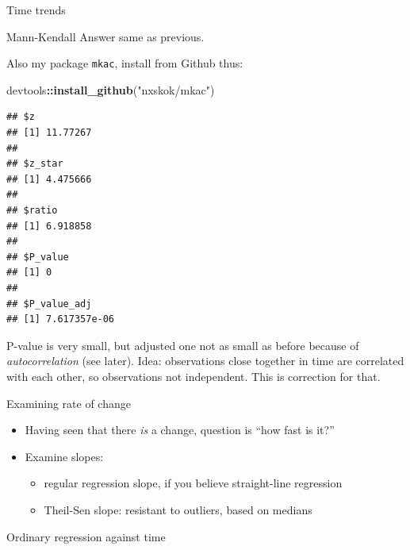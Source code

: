 \documentclass[ignorenonframetext,]{beamer}
\newenvironment{Shaded}{\begin{snugshade}}{\end{snugshade}}
\newcommand{\KeywordTok}[1]{\textcolor[rgb]{0.13,0.29,0.53}{\textbf{#1}}}
\newcommand{\NormalTok}[1]{#1}
\newcommand{\OperatorTok}[1]{\textcolor[rgb]{0.81,0.36,0.00}{\textbf{#1}}}
\newcommand{\StringTok}[1]{\textcolor[rgb]{0.31,0.60,0.02}{#1}}
\providecommand{\tightlist}{%
  \setlength{\itemsep}{0pt}\setlength{\parskip}{0pt}}
\begin{document}
\begin{frame}[fragile]{Time trends}
\begin{block}{Mann-Kendall}
Answer same as previous.

Also my package \texttt{mkac}, install from Github thus:

\begin{Shaded}
\begin{Highlighting}[]
\NormalTok{devtools}\OperatorTok{::}\KeywordTok{install_github}\NormalTok{(}\StringTok{"nxskok/mkac"}\NormalTok{)}
\end{Highlighting}
\end{Shaded}

\begin{Shaded}
\end{Shaded}

\begin{verbatim}
## $z
## [1] 11.77267
## 
## $z_star
## [1] 4.475666
## 
## $ratio
## [1] 6.918858
## 
## $P_value
## [1] 0
## 
## $P_value_adj
## [1] 7.617357e-06
\end{verbatim}

P-value is very small, but adjusted one not as small as before because
of \emph{autocorrelation} (see later). Idea: observations close together
in time are correlated with each other, so observations not independent.
This is correction for that.

\end{block}

\begin{block}{Examining rate of change}

\begin{itemize}
\item
  Having seen that there \emph{is} a change, question is ``how fast is
  it?''
\item
  Examine slopes:

  \begin{itemize}
  \tightlist
  \item
    regular regression slope, if you believe straight-line regression
  \item
    Theil-Sen slope: resistant to outliers, based on medians
  \end{itemize}
\end{itemize}

\end{block}

\begin{block}{Ordinary regression against time}


\end{block}
\end{frame}
\end{document}

